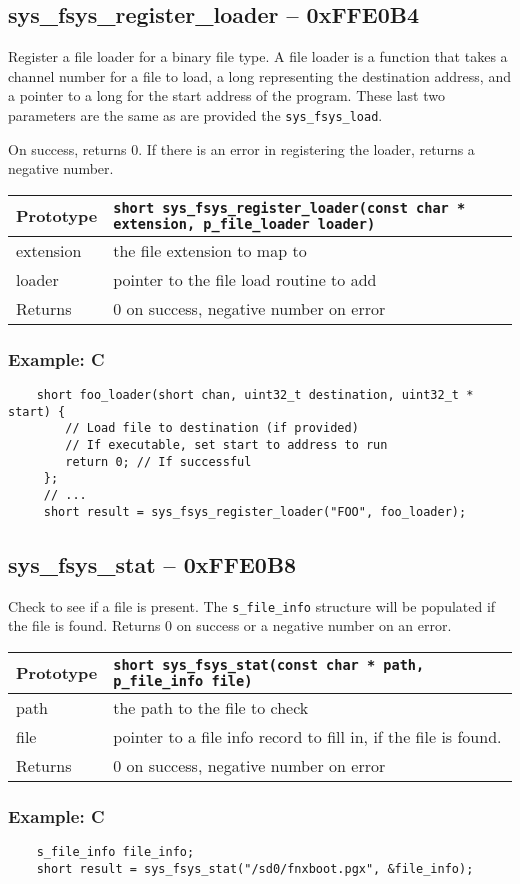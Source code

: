 \subsection*{sys\_fsys\_register\_loader -- 0xFFE0B4}
Register a file loader for a binary file type.
A file loader is a function that takes a channel number for a file to load, a long representing the destination address,
and a pointer to a long for the start address of the program. These last two parameters are the same as are provided the \verb+sys_fsys_load+.

On success, returns 0. If there is an error in registering the loader, returns a negative number.

\bigskip

\begin{tabular}{|l||l|} \hline
Prototype & \lstinline!short sys_fsys_register_loader(const char * extension, p_file_loader loader)! \\ \hline
extension & the file extension to map to \\ \hline
loader & pointer to the file load routine to add \\ \hline
Returns & 0 on success, negative number on error \\ \hline
\end{tabular}

\subsubsection*{Example: C}
\begin{lstlisting}
    short foo_loader(short chan, uint32_t destination, uint32_t * start) {
        // Load file to destination (if provided)
        // If executable, set start to address to run
        return 0; // If successful
     };
     // ...
     short result = sys_fsys_register_loader("FOO", foo_loader);
\end{lstlisting}

\subsection*{sys\_fsys\_stat -- 0xFFE0B8}
Check to see if a file is present. The \verb+s_file_info+ structure will be populated if the file is found.
Returns 0 on success or a negative number on an error.

\bigskip

\begin{tabular}{|l||l|} \hline
Prototype & \lstinline!short sys_fsys_stat(const char * path, p_file_info file)! \\ \hline
path & the path to the file to check \\ \hline
file & pointer to a file info record to fill in, if the file is found. \\ \hline
Returns & 0 on success, negative number on error \\ \hline
\end{tabular}

\subsubsection*{Example: C}
\begin{lstlisting}
    s_file_info file_info;
    short result = sys_fsys_stat("/sd0/fnxboot.pgx", &file_info);
\end{lstlisting}